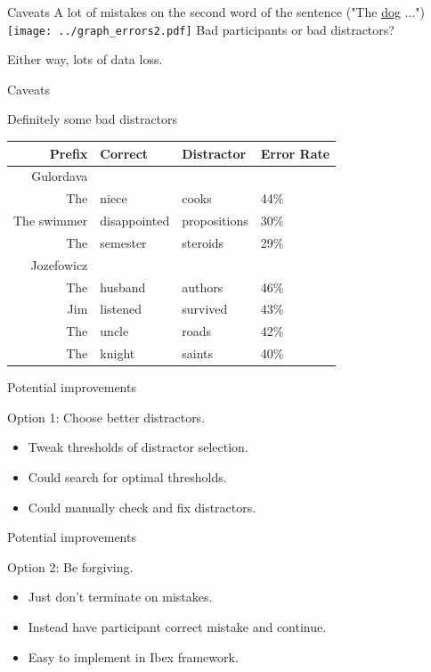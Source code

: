 \documentclass[12pt, xcolor=beamer,table,usenames,dvipsnames, ignorenonframetext, ngerman]{beamer}
\begin{document}
\begin{frame}{Caveats}
A lot of mistakes on the second word of the sentence ("The \ul{dog} ...") \pause
\texttt{[image: ../graph\_errors2.pdf]} \pause
Bad participants or bad distractors? 

Either way, lots of data loss.
\end{frame}

\begin{frame}{Caveats}

{\large Definitely some bad distractors}
\begin{table}
	
		
		\begin{tabular}{rlll}
			Prefix & Correct & Distractor & Error Rate \\
			\hline
			\hline
			Gulordava&&&\\
			\hline
			The & niece & cooks & 44\%\\
			The swimmer & disappointed & propositions & 30\%\\
			The & semester & steroids & 29\%\\
			\hline
			\hline
			 Jozefowicz&&&\\
			\hline
			The & husband & authors & 46\%\\
			Jim & listened & survived & 43\%\\
			The & uncle & roads & 42\%\\
			The & knight & saints & 40\%\\
		\end{tabular}
\end{table}

\end{frame}

\begin{frame}{Potential improvements}

{\large Option 1: Choose better distractors.}
\begin{itemize}
	\item Tweak thresholds of distractor selection.
	\item Could search for optimal thresholds.
	\item Could manually check and fix distractors.
\end{itemize}

\end{frame}

\begin{frame}{Potential improvements}

{\large Option 2: Be forgiving.}
\begin{itemize}
	\item Just don't terminate on mistakes.
	\item Instead have participant correct mistake and continue. 
	\item Easy to implement in Ibex framework.
	\end{itemize}
\end{frame}
\end{document}
